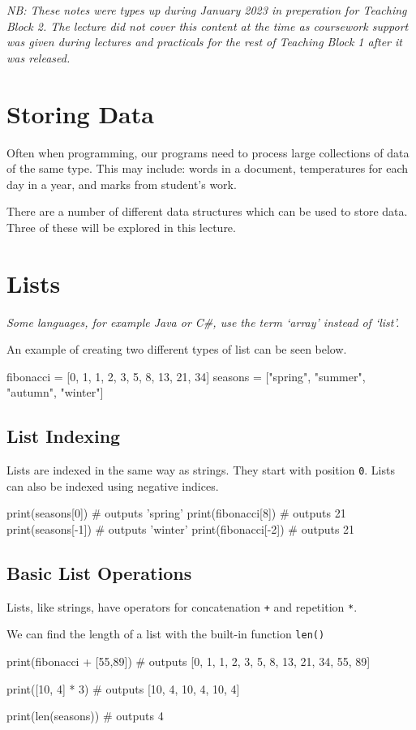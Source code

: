 
\textit{NB: These notes were types up during January 2023 in preperation for Teaching Block 2. The lecture did not cover this content at the time as coursework support was given during lectures and practicals for the rest of Teaching Block 1 after it was released.}

\section*{Storing Data}
Often when programming, our programs need to process large collections of data of the same type. This may include: words in a document, temperatures for each day in a year, and marks from student's work.

There are a number of different data structures which can be used to store data. Three of these will be explored in this lecture.

\section*{Lists}
\textit{Some languages, for example Java or C\#, use the term `array' instead of `list'.}

An example of creating two different types of list can be seen below.
\begin{python}
fibonacci = [0, 1, 1, 2, 3, 5, 8, 13, 21, 34]
seasons = ["spring", "summer", "autumn", "winter"]
\end{python}

\subsection*{List Indexing}
Lists are indexed in the same way as strings. They start with position \verb|0|. Lists can also be indexed using negative indices.
\begin{python}
print(seasons[0])  # outputs 'spring'
print(fibonacci[8])  # outputs 21
print(seasons[-1])  # outputs 'winter'
print(fibonacci[-2])  # outputs 21
\end{python}

\subsection*{Basic List Operations}
Lists, like strings, have operators for concatenation \verb|+| and repetition \verb|*|.

We can find the length of a list with the built-in function \verb|len()|
\begin{python}
print(fibonacci + [55,89])
# outputs [0, 1, 1, 2, 3, 5, 8, 13, 21, 34, 55, 89]

print([10, 4] * 3)
# outputs [10, 4, 10, 4, 10, 4]

print(len(seasons))
# outputs 4
\end{python}

